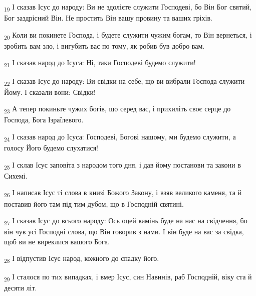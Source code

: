 \begin{tcolorbox}
\textsubscript{19} І сказав Ісус до народу: Ви не здолієте служити Господеві, бо Він Бог святий, Бог заздрісний Він. Не простить Він вашу провину та ваших гріхів.
\end{tcolorbox}
\begin{tcolorbox}
\textsubscript{20} Коли ви покинете Господа, і будете служити чужим богам, то Він вернеться, і зробить вам зло, і вигубить вас по тому, як робив був добро вам.
\end{tcolorbox}
\begin{tcolorbox}
\textsubscript{21} І сказав народ до Ісуса: Ні, таки Господеві будемо служити!
\end{tcolorbox}
\begin{tcolorbox}
\textsubscript{22} І сказав Ісус до народу: Ви свідки на себе, що ви вибрали Господа служити Йому. І сказали вони: Свідки!
\end{tcolorbox}
\begin{tcolorbox}
\textsubscript{23} А тепер покиньте чужих богів, що серед вас, і прихиліть своє серце до Господа, Бога Ізраїлевого.
\end{tcolorbox}
\begin{tcolorbox}
\textsubscript{24} І сказав народ до Ісуса: Господеві, Богові нашому, ми будемо служити, а голосу Його будемо слухатися!
\end{tcolorbox}
\begin{tcolorbox}
\textsubscript{25} І склав Ісус заповіта з народом того дня, і дав йому постанови та закони в Сихемі.
\end{tcolorbox}
\begin{tcolorbox}
\textsubscript{26} І написав Ісус ті слова в книзі Божого Закону, і взяв великого каменя, та й поставив його там під тим дубом, що в Господній святині.
\end{tcolorbox}
\begin{tcolorbox}
\textsubscript{27} І сказав Ісус до всього народу: Ось оцей камінь буде на нас на свідчення, бо він чув усі Господні слова, що Він говорив з нами. І він буде на вас за свідка, щоб ви не виреклися вашого Бога.
\end{tcolorbox}
\begin{tcolorbox}
\textsubscript{28} І відпустив Ісус народ, кожного до спадку його.
\end{tcolorbox}
\begin{tcolorbox}
\textsubscript{29} І сталося по тих випадках, і вмер Ісус, син Навинів, раб Господній, віку ста й десяти літ.
\end{tcolorbox}
